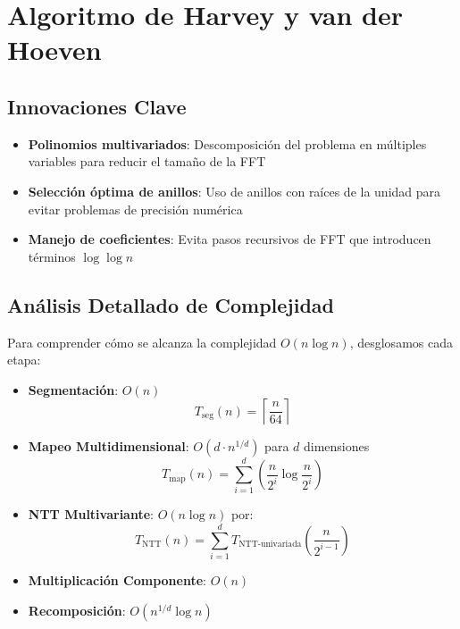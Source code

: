 \documentclass{article}
\begin{document}
\section{Algoritmo de Harvey y van der Hoeven}
\subsection{Innovaciones Clave}
\begin{itemize}
    \item \textbf{Polinomios multivariados}: Descomposición del problema en múltiples variables para reducir el tamaño de la FFT
    \item \textbf{Selección óptima de anillos}: Uso de anillos con raíces de la unidad para evitar problemas de precisión numérica
    \item \textbf{Manejo de coeficientes}: Evita pasos recursivos de FFT que introducen términos \( \log \log n \)
\end{itemize}

\subsection{Análisis Detallado de Complejidad}
Para comprender cómo se alcanza la complejidad \( O(n \log n) \), desglosamos cada etapa:

\begin{itemize}
    \item \textbf{Segmentación}: \( O(n) \)
    \begin{equation}
        T_{\text{seg}}(n) = \left\lceil \frac{n}{64} \right\rceil
    \end{equation}
    
    \item \textbf{Mapeo Multidimensional}: \( O(d \cdot n^{1/d}) \) para \( d \) dimensiones
    \begin{equation}
        T_{\text{map}}(n) = \sum_{i=1}^d \left( \frac{n}{2^i} \log \frac{n}{2^i} \right)
    \end{equation}
    
    \item \textbf{NTT Multivariante}: \( O(n \log n) \) por:
    \begin{equation}
        T_{\text{NTT}}(n) = \sum_{i=1}^d T_{\text{NTT-univariada}}\left(\frac{n}{2^{i-1}}\right)
    \end{equation}
    
    \item \textbf{Multiplicación Componente}: \( O(n) \)
    \item \textbf{Recomposición}: \( O(n^{1/d} \log n) \)
\end{itemize}
\end{document}
